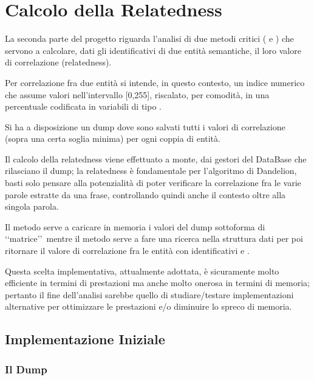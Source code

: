 \chapter{Calcolo della Relatedness}

La seconda parte del progetto riguarda l'analisi di due metodi critici ( e ) che servono a 
calcolare, dati gli identificativi di due entità semantiche, il loro valore di correlazione (relatedness). 

Per correlazione fra due entità si intende, in questo contesto, un indice numerico che assume valori nell'intervallo [0,255], 
riscalato, per comodità, in una percentuale codificata in variabili di tipo . 

Si ha a disposizione un dump dove sono salvati tutti i valori di correlazione (sopra una certa soglia minima) per ogni coppia di entità. 

Il calcolo della relatedness viene effettuato a monte,
dai gestori del DataBase che rilasciano il dump; la relatedness è fondamentale per l'algoritmo di Dandelion, basti solo pensare alla potenzialità 
di poter verificare la correlazione fra le varie parole estratte da una frase, controllando quindi anche il contesto oltre alla singola parola.

Il metodo  serve a caricare in memoria i valori del dump 
sottoforma di \lq\lq matrice\rq\rq\ mentre il metodo  serve a fare una ricerca nella struttura dati per poi ritornare il valore di 
correlazione fra le entità con identificativi  e .

Questa scelta implementativa, attualmente adottata, è sicuramente molto efficiente in termini di prestazioni ma anche molto onerosa in termini di memoria; 
pertanto il fine dell'analisi sarebbe quello di studiare/testare implementazioni alternative per ottimizzare le prestazioni e/o diminuire lo spreco di memoria.  

\section{Implementazione Iniziale}

\subsection{Il Dump}

